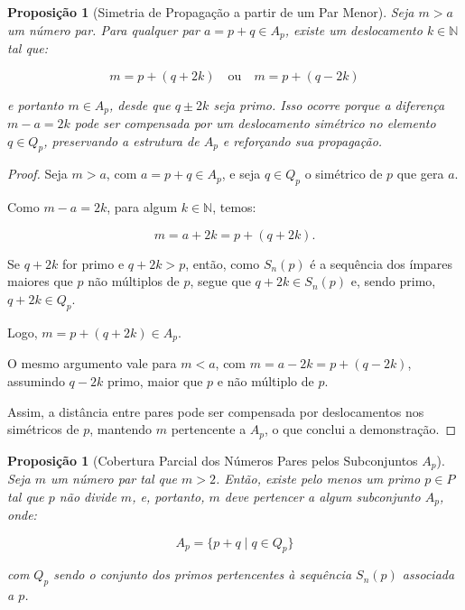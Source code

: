 \documentclass[a4paper,11pt]{article}
\newtheorem{proposition}[theorem]{Proposição}
\theoremstyle{definition}
\theoremstyle{remark}
\begin{document}
\begin{otherlanguage}{brazil}
	\begin{proposition}[Simetria de Propagação a partir de um Par Menor]\label{prop:propagacao_a_partir_par_menor}
		Seja \(m > a\) um número par. Para qualquer par \(a = p + q \in A_p\), existe um deslocamento \(k \in \mathbb{N}\) tal que:
		
		\[
		m = p + (q + 2k) \quad \text{ou} \quad m = p + (q - 2k)
		\]
		
		e portanto \(m \in A_p\), desde que \(q \pm 2k\) seja primo. Isso ocorre porque a diferença \(m - a = 2k\) pode ser compensada por um deslocamento simétrico no elemento \(q \in Q_p\), preservando a estrutura de \(A_p\) e reforçando sua propagação.
	\end{proposition}
	
	\begin{proof}
		Seja \(m > a\), com \(a = p + q \in A_p\), e seja \(q \in Q_p\) o simétrico de \(p\) que gera \(a\).
		
		Como \(m - a = 2k\), para algum \(k \in \mathbb{N}\), temos:
		
		\[
		m = a + 2k = p + (q + 2k).
		\]
		
		Se \(q + 2k\) for primo e \(q + 2k > p\), então, como \(S_n(p)\) é a sequência dos ímpares maiores que \(p\) não múltiplos de \(p\), segue que \(q + 2k \in S_n(p)\) e, sendo primo, \(q + 2k \in Q_p\).
		
		Logo, \(m = p + (q + 2k) \in A_p\).
		
		O mesmo argumento vale para \(m < a\), com \(m = a - 2k = p + (q - 2k)\), assumindo \(q - 2k\) primo, maior que \(p\) e não múltiplo de \(p\).
		
		Assim, a distância entre pares pode ser compensada por deslocamentos nos simétricos de \(p\), mantendo \(m\) pertencente a \(A_p\), o que conclui a demonstração.
	\end{proof}
	
	\begin{proposition}[Cobertura Parcial dos Números Pares pelos Subconjuntos \(A_p\)]\label{prop:cobertura_parcial_dos_pares}
		Seja \(m\) um número par tal que \(m > 2\). Então, existe pelo menos um primo \(p \in P\) tal que \(p\) não divide \(m\), e, portanto, \(m\) deve pertencer a algum subconjunto \(A_p\), onde:
		
		\[
		A_p = \{p + q \mid q \in Q_p\}
		\]
		
		com \(Q_p\) sendo o conjunto dos primos pertencentes à sequência \(S_n(p)\) associada a \(p\).
	\end{proposition}
	

\end{otherlanguage}
\end{document}
